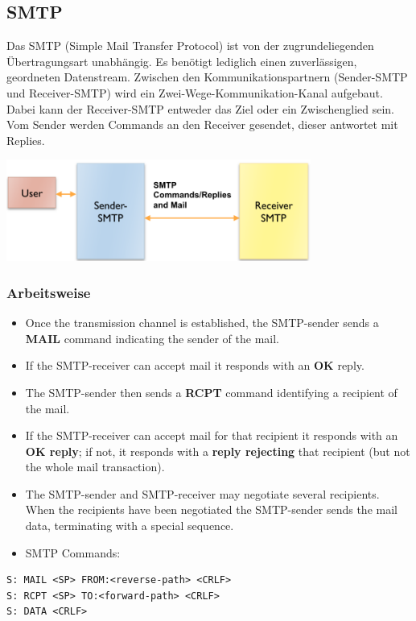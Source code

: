 \documentclass{article} %
\begin{document}
\subsection{SMTP}

Das SMTP (Simple Mail Transfer Protocol)\cite{rfc821} ist von der zugrundeliegenden Übertragungsart unabhängig. Es benötigt lediglich einen zuverlässigen, geordneten Datenstream. Zwischen den Kommunikationspartnern (Sender-SMTP und Receiver-SMTP) wird ein Zwei-Wege-Kommunikation-Kanal aufgebaut. Dabei kann der Receiver-SMTP entweder das Ziel oder ein Zwischenglied sein. Vom Sender werden Commands an den Receiver gesendet, dieser antwortet mit Replies. 
\begin{center}
	\includegraphics[width=10cm]{img/smtp.png}
\end{center}
\subsubsection{Arbeitsweise}
	\begin{itemize}
	\item Once the transmission channel is established, the SMTP-sender sends a \textbf{MAIL} command indicating the sender of the mail. 
	\item If the SMTP-receiver can accept mail it responds with an \textbf{OK} reply.
	\item The SMTP-sender then sends a \textbf{RCPT} command identifying a recipient of the mail. 
	\item If the SMTP-receiver can accept mail for that recipient it responds with an \textbf{OK reply}; if not, it responds with a \textbf{reply rejecting} that recipient (but not the whole mail transaction). 
	\item The SMTP-sender and SMTP-receiver may negotiate several recipients. When the recipients have been negotiated the SMTP-sender sends the mail data, terminating with a special sequence.  
	\item SMTP Commands:
	\end{itemize}
	\begin{verbatim}
S: MAIL <SP> FROM:<reverse-path> <CRLF> 
S: RCPT <SP> TO:<forward-path> <CRLF> 
S: DATA <CRLF> 
	\end{verbatim}
\end{document}
